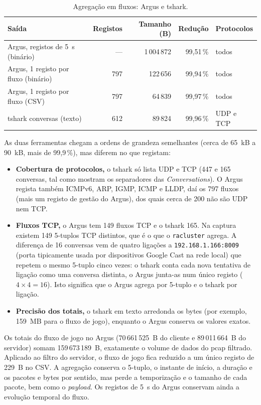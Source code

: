 \documentclass[10.5pt,a4paper]{article}
\newcommand{\ip}[1]{\texttt{#1}}
\begin{document}
\begin{table}[htbp]
\centering
\caption{Agregação em fluxos: Argus e tshark.}\label{tab:agg}
\small
\begin{tabular}{@{}lrrrl@{}}
\toprule
Saída & Registos & Tamanho (B) & Redução & Protocolos\\
\midrule
Argus, registos de 5~s (binário)    & ---  & 1\,004\,872 & 99,51\,\% & todos\\
Argus, 1 registo por fluxo (binário) & 797 &    122\,656 & 99,94\,\% & todos\\
Argus, 1 registo por fluxo (CSV)    & 797  &     64\,839 & 99,97\,\% & todos\\
tshark conversas (texto)            & 612  &     89\,824 & 99,96\,\% & UDP e TCP\\
\bottomrule
\end{tabular}
\end{table}

As duas ferramentas chegam a ordens de grandeza semelhantes (cerca de 65~kB a 90~kB, mais de
99,9\,\%), mas diferem no que registam:
\begin{itemize}
  \item \textbf{Cobertura de protocolos,} o tshark só lista UDP e TCP (447 e 165 conversas, tal
        como mostram os separadores das \emph{Conversations}). O Argus regista também ICMPv6,
        ARP, IGMP, ICMP e LLDP, daí os 797 fluxos (mais um registo de gestão do Argus), dos
        quais cerca de 200 não são UDP nem TCP.
  \item \textbf{Fluxos TCP,} o Argus tem 149 fluxos TCP e o tshark 165. Na captura existem 149
        5-tuplos TCP distintos, que é o que o \texttt{racluster} agrega. A diferença de 16
        conversas vem de quatro ligações a \ip{192.168.1.166:8009} (porta tipicamente usada
        por dispositivos Google Cast na rede local) que repetem o mesmo 5-tuplo cinco vezes: o
        tshark conta cada nova tentativa de ligação como uma conversa distinta, o Argus junta-as
        num único registo ($4\times 4 = 16$). Isto significa que o Argus agrega por 5-tuplo e o
        tshark por ligação.
  \item \textbf{Precisão dos totais,} o tshark em texto arredonda os bytes (por exemplo,
        159~MB para o fluxo de jogo), enquanto o Argus conserva os valores exatos.
\end{itemize}

Os totais do fluxo de jogo no Argus (70\,661\,525~B do cliente e 89\,011\,664~B do servidor)
somam 159\,673\,189~B, exatamente o volume de dados do pcap filtrado. Aplicado ao filtro do
servidor, o fluxo de jogo fica reduzido a um único registo de 229~B no CSV. A agregação conserva
o 5-tuplo, o instante de início, a duração e os pacotes e bytes por sentido, mas perde a
temporização e o tamanho de cada pacote, bem como o \emph{payload}. Os registos de 5~s do Argus
conservam ainda a evolução temporal do fluxo.
\end{document}
